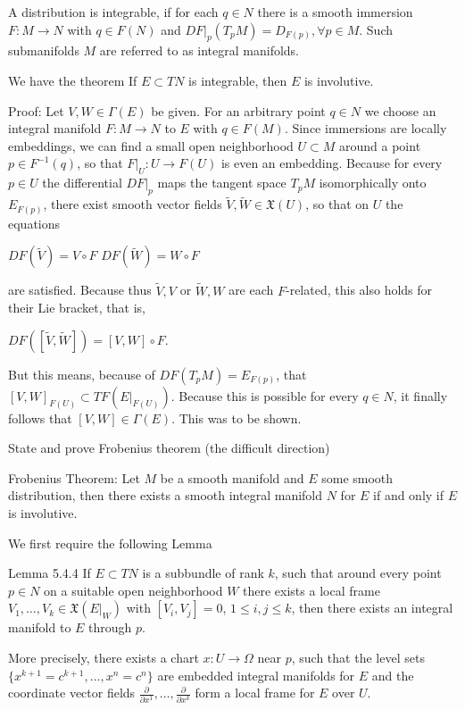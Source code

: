 A distribution is integrable, if for each \( q \in N \) there is a smooth immersion 
\( F : M \to N\) with \( q \in F(N) \) and \( DF|_p(T_pM) = D_{F(p)}, \forall p \in M \).
Such submanifolds \( M \) are referred to as integral manifolds.

We have the theorem
If \( E \subset TN \) is integrable, then \( E \) is involutive.

Proof: 
Let \(V, W \in \Gamma(E)\) be given. For an arbitrary point \(q \in N\) we choose an integral manifold \(F: M \to N\) to \(E\) with \(q \in F(M)\). 
Since immersions are locally embeddings, we can find a small open neighborhood \(U \subset M\) around a point \(p \in F^{-1}(q)\), 
so that \(F|_U: U \to F(U)\) is even an embedding. 
Because for every \(p \in U\) the differential \(DF|_p\) maps the tangent space \(T_pM\) isomorphically onto \(E_{F(p)}\), 
there exist smooth vector fields \(\tilde{V}, \tilde{W} \in \mathfrak{X}(U)\), so that on \(U\) the equations

\(DF(\tilde{V}) = V \circ F\) 
\(DF(\tilde{W}) = W \circ F\)

are satisfied. Because thus \(\tilde{V}, V\) or \(\tilde{W}, W\) are each \(F\)-related, this also holds for their Lie bracket, that is,

\(DF([\tilde{V}, \tilde{W}]) = [V, W] \circ F.\)

But this means, because of \(DF(T_pM) = E_{F(p)}\), that \([V, W]_{F(U)} \subset TF(E|_{F(U)})\). 
Because this is possible for every \(q \in N\), it finally follows that \([V, W] \in \Gamma(E)\). This was to be shown.



State and prove Frobenius theorem (the difficult direction)

Frobenius Theorem:
Let \( M \) be a smooth manifold and \( E \) some smooth distribution,
then there exists a smooth integral manifold \( N \) for \( E \) if and only if
\( E \) is involutive.

We first require the following Lemma

Lemma 5.4.4
If \(E \subset TN\) is a subbundle of rank \(k\), such that around every point \(p \in N\) on a suitable open neighborhood \(W\) 
there exists a local frame \(V_1, \dots, V_k \in \mathfrak{X}(E|_W)\) with \([V_i, V_j] = 0\), \(1 \leq i, j \leq k\), 
then there exists an integral manifold to \(E\) through \(p\). 

More precisely, there exists a chart \(x : U \to \Omega\) near \(p\), such that the level sets \(\{x^{k+1} = c^{k+1}, \dots, x^n = c^n\}\) are embedded integral manifolds for \(E\) and the coordinate vector fields \(\frac{\partial}{\partial x^1}, \dots, \frac{\partial}{\partial x^k}\) form a local frame for \(E\) over \(U\).


